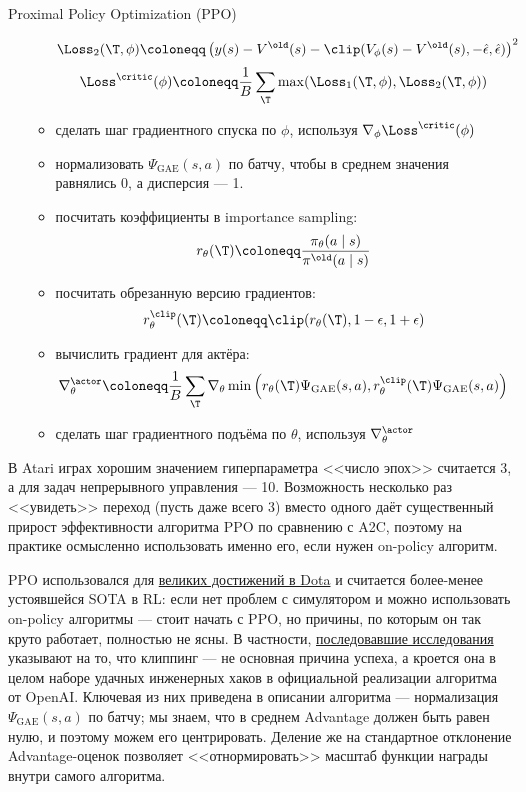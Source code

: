 \begin{algorithm}[label = PPOalgorithm]{Proximal Policy Optimization (PPO)}
\begin{enumerate}
\begin{itemize}
    $$\Loss_2(\T, \phi) \coloneqq \left( y(s) - V^{\old}(s) - \clip(V_\phi(s) - V^{\old}(s), -\hat{\epsilon}, \hat{\epsilon}) \right) ^2$$
    $$\Loss^{\critic}(\phi) \coloneqq \frac{1}{B}\sum_{\T} \max(\Loss_1(\T, \phi), \Loss_2(\T, \phi))$$
    \item сделать шаг градиентного спуска по $\phi$, используя $\nabla_\phi \Loss^{\critic}(\phi)$
    \item нормализовать $\Psi_{\mathrm{GAE}}(s, a)$ по батчу, чтобы в среднем значения равнялись 0, а дисперсия --- 1.
    \item посчитать коэффициенты в importance sampling:
    $$r_\theta(\T) \coloneqq \frac{\pi_\theta(a \mid s)}{\pi^{\old}(a \mid s)}$$
    \item посчитать обрезанную версию градиентов:
    $$r_\theta^{\clip}(\T) \coloneqq \clip(r_\theta(\T), 1 - \epsilon, 1 + \epsilon)$$
    \item вычислить градиент для актёра:
    $$\nabla^{\actor}_\theta \coloneqq \frac{1}{B}\sum_{\T} \nabla_\theta \min \left( r_\theta(\T)\Psi_{\mathrm{GAE}}(s, a), r_\theta^{\clip}(\T)\Psi_{\mathrm{GAE}}(s, a) \right) $$
    \item сделать шаг градиентного подъёма по $\theta$, используя $\nabla^{\actor}_\theta$
    \end{itemize}
\end{enumerate}
\end{algorithm}

\begin{remark}
В Atari играх хорошим значением гиперпараметра <<число эпох>> считается 3, а для задач непрерывного управления --- 10. Возможность несколько раз <<увидеть>> переход (пусть даже всего 3) вместо одного даёт существенный прирост эффективности алгоритма PPO по сравнению с A2C, поэтому на практике осмысленно использовать именно его, если нужен on-policy алгоритм.  
\end{remark}

\begin{remark}
PPO использовался для \href{https://openai.com/blog/openai-five/}{великих достижений в Dota} и считается более-менее устоявшейся SOTA в RL: если нет проблем с симулятором и можно использовать on-policy алгоритмы --- стоит начать с PPO, но причины, по которым он так круто работает, полностью не ясны. В частности, \href{https://openreview.net/forum?id=r1etN1rtPB}{последовавшие исследования} указывают на то, что клиппинг --- не основная причина успеха, а кроется она в целом наборе удачных инженерных хаков в официальной реализации алгоритма от OpenAI. Ключевая из них приведена в описании алгоритма --- нормализация $\Psi_{\mathrm{GAE}}(s, a)$ по батчу; мы знаем, что в среднем Advantage должен быть равен нулю, и поэтому можем его центрировать. Деление же на стандартное отклонение Advantage-оценок позволяет <<отнормировать>> масштаб функции награды внутри самого алгоритма.
\end{remark}

